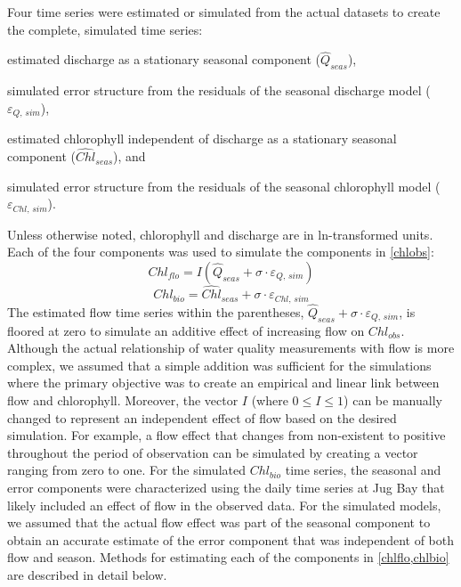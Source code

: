 \documentclass[letterpaper,12pt,oneside]{article}\usepackage[]{graphicx}\usepackage[]{color}
\begin{document}
Four time series were estimated or simulated from the actual datasets to create the complete, simulated time series:\begin{inparaenum}[1\upshape)]
\item estimated discharge as a stationary seasonal component ($\widehat{Q}_{seas}$),
\item simulated error structure from the residuals of the seasonal discharge model ($\varepsilon_{Q,\,sim}$), 
\item estimated chlorophyll independent of discharge as a stationary seasonal component ($\widehat{Chl}_{seas}$), and
\item simulated error structure from the residuals of the seasonal chlorophyll model ($\varepsilon_{Chl,\,sim}$).
\end{inparaenum}
Unless otherwise noted, chlorophyll and discharge are in ln-transformed units.  Each of the four components was used to simulate the components in \cref{chlobs}:
\begin{equation} \label{chlflo}
Chl_{flo} = I\left(\widehat{Q}_{seas} + \sigma\cdot\varepsilon_{Q,\,sim}\right)
\end{equation}
\begin{equation} \label{chlbio}
Chl_{bio} = \widehat{Chl}_{seas} + \sigma\cdot\varepsilon_{Chl,\,sim}
\end{equation}
The estimated flow time series within the parentheses, $\widehat{Q}_{seas} + \sigma\cdot\varepsilon_{Q,\,sim}$, is floored at zero to simulate an additive effect of increasing flow on $Chl_{obs}$.  Although the actual relationship of water quality measurements with flow is more complex, we assumed that a simple addition was sufficient for the simulations where the primary objective was to create an empirical and linear link between flow and chlorophyll. Moreover, the vector $I$ (where $0 \leq I \leq 1$) can be manually changed to represent an independent effect of flow based on the desired simulation.  For example, a flow effect that changes from non-existent to positive throughout the period of observation can be simulated by creating a vector ranging from zero to one. For the simulated $Chl_{bio}$ time series, the seasonal and error components were characterized using the daily time series at Jug Bay that likely included an effect of flow in the observed data.  For the simulated models, we assumed that the actual flow effect was part of the seasonal component to obtain an accurate estimate of the error component that was independent of both flow and season.  Methods for estimating each of the components in \cref{chlflo,chlbio} are described in detail below.
\end{document}
